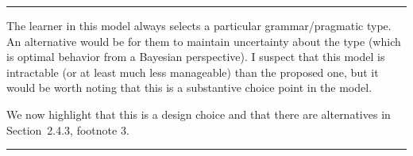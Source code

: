 \documentclass[12pt,a4paper]{article}
\begin{document}
\vspace{0.5cm}

\noindent\rule{\textwidth}{1pt}

\begin{mdframed}[backgroundcolor=gray!25,linecolor=gray!25,frametitle= Reviewer \thereviewerCounter~comment \thereviewerCommentCounter \hfill ~~({\it posterior type sampling})]
%
The learner in this model always selects a particular grammar/pragmatic type. An alternative would be for them to maintain uncertainty about the type (which is optimal behavior from a Bayesian perspective). I suspect that this model is intractable (or at least much less manageable) than the proposed one, but it would be worth noting that this is a substantive choice point in the model.
\end{mdframed}
We now highlight that this is a design choice and that there are alternatives in Section~2.4.3, footnote 3.

\vspace{0.5cm}

\noindent\rule{\textwidth}{1pt}
\end{document}
